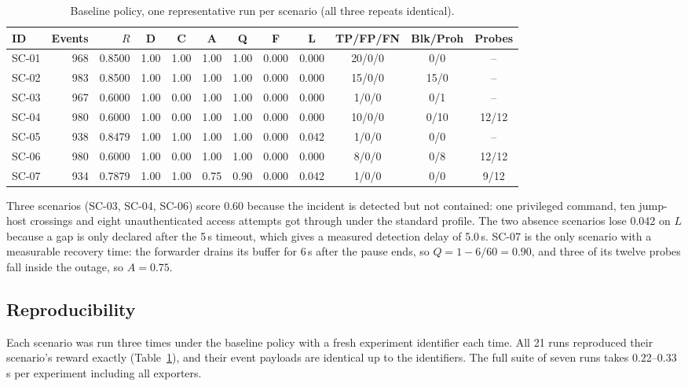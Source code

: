 \documentclass[11pt]{article}
\begin{document}
\begin{table}[h]
\centering
\caption{Baseline policy, one representative run per scenario (all three repeats identical).}
\label{tab:baseline}
\small
\setlength{\tabcolsep}{4pt}
\begin{tabular}{l r r c c c c c c c c c}
\toprule
\textbf{ID} & \textbf{Events} & \textbf{$R$} & \textbf{D} & \textbf{C} & \textbf{A} & \textbf{Q} & \textbf{F} & \textbf{L} & \textbf{TP/FP/FN} & \textbf{Blk/Proh} & \textbf{Probes}\\
\midrule
SC-01 & 968 & 0.8500 & 1.00 & 1.00 & 1.00 & 1.00 & 0.000 & 0.000 & 20/0/0 & 0/0 & --\\
SC-02 & 983 & 0.8500 & 1.00 & 1.00 & 1.00 & 1.00 & 0.000 & 0.000 & 15/0/0 & 15/0 & --\\
SC-03 & 967 & 0.6000 & 1.00 & 0.00 & 1.00 & 1.00 & 0.000 & 0.000 & 1/0/0 & 0/1 & --\\
SC-04 & 980 & 0.6000 & 1.00 & 0.00 & 1.00 & 1.00 & 0.000 & 0.000 & 10/0/0 & 0/10 & 12/12\\
SC-05 & 938 & 0.8479 & 1.00 & 1.00 & 1.00 & 1.00 & 0.000 & 0.042 & 1/0/0 & 0/0 & --\\
SC-06 & 980 & 0.6000 & 1.00 & 0.00 & 1.00 & 1.00 & 0.000 & 0.000 & 8/0/0 & 0/8 & 12/12\\
SC-07 & 934 & 0.7879 & 1.00 & 1.00 & 0.75 & 0.90 & 0.000 & 0.042 & 1/0/0 & 0/0 & 9/12\\
\bottomrule
\end{tabular}
\end{table}

Three scenarios (SC-03, SC-04, SC-06) score 0.60 because the incident is detected
but not contained: one privileged command, ten jump-host crossings and eight
unauthenticated access attempts got through under the standard profile. The two
absence scenarios lose 0.042 on $L$ because a gap is only declared after the 5\,s
timeout, which gives a measured detection delay of 5.0\,s. SC-07 is the only
scenario with a measurable recovery time: the forwarder drains its buffer for 6\,s
after the pause ends, so $Q = 1 - 6/60 = 0.90$, and three of its twelve probes fall
inside the outage, so $A=0.75$.

\subsection{Reproducibility}
Each scenario was run three times under the baseline policy with a fresh
experiment identifier each time. All 21 runs reproduced their scenario's reward
exactly (Table~\ref{tab:baseline}), and their event payloads are identical up to
the identifiers. The full suite of seven runs takes 0.22--0.33\,s per experiment
including all exporters.
\end{document}

